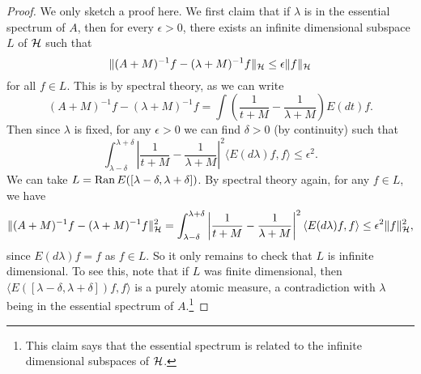 \begin{proof}
  We only sketch a proof here. We first claim that if
  $\lambda$ is in the essential spectrum of $A$, then
  for every $\epsilon > 0$, there exists
  an infinite dimensional subspace $L$ of $\mathcal{H}$
  such that
  \[
    \|(A + M)^{-1} f - (\lambda + M)^{-1} f\|_{\mathcal{H}}
    \le \epsilon \|f\|_{\mathcal{H}}
  \]
  for all $f \in L$.
  This is by spectral theory, as we can write
  \[
    (A + M)^{-1} f - (\lambda + M)^{-1} f
    = \int \left(\frac{1}{t + M} - \frac{1}{\lambda + M}\right) E(dt) f.
  \]
  Then since $\lambda$ is fixed, for any $\epsilon > 0$
  we can find $\delta > 0$ (by continuity) such that
  \[
    \int_{\lambda - \delta}^{\lambda + \delta}
    \left|\frac{1}{t + M} - \frac{1}{\lambda + M}\right|^2 \langle E(d\lambda) f, f \rangle \le \epsilon^2.
  \]
  We can take $L = \operatorname{Ran} E([\lambda - \delta, \lambda + \delta])$.
  By spectral theory again, for any $f \in L$, we have
  \[
    \|(A + M)^{-1} f - (\lambda + M)^{-1} f\|_{\mathcal{H}}^2
    = \int_{\lambda - \delta}^{\lambda + \delta}
    \left|\frac{1}{t + M} - \frac{1}{\lambda + M}\right|^2 \langle E(d\lambda) f, f \rangle
    \le \epsilon^2 \|f\|_{\mathcal{H}}^2,
  \]
  since $E(d\lambda) f = f$ as
  $f \in L$. So it only remains to check that $L$ is
  infinite dimensional. To see this, note that if
  $L$ was finite dimensional, then
  $\langle E([\lambda - \delta, \lambda + \delta]) f, f \rangle$
  is a purely atomic measure, a contradiction with
  $\lambda$ being in the essential spectrum of $A$.\footnote{This claim says that the essential spectrum is related to the infinite dimensional subspaces of $\mathcal{H}$.}


\end{proof}
